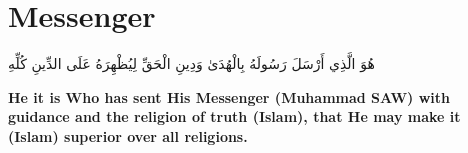 \chapter{Messenger}
\begin{center}
    {\Huge    
        \begin{Arabic}
            هُوَ الَّذِي أَرْسَلَ رَسُولَهُ بِالْهُدَىٰ وَدِينِ الْحَقِّ لِيُظْهِرَهُ عَلَى الدِّينِ كُلِّهِ
        \end{Arabic}
    }
\end{center}
\vspace*{\fill}
\vspace{3cm}
\begin{center}
    \large \textbf{He it is Who has sent His Messenger (Muhammad SAW) with guidance and the religion of truth (Islam), that He may make it (Islam) superior over all religions.}
\end{center}
